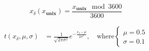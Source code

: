 \begin{equation}\label{eq:unix_time}
    x_\delta(x_{\textbf{unix}}) = \frac{x_\textbf{unix}\mod 3600}{3600}
\end{equation}

\begin{align}\label{eq:gaus}
    t(x_\delta, \mu, \sigma) &= \frac{1}{\sqrt{2\pi\sigma^2}} e^{-\frac{x_\delta-\mu}{2\sigma^2}}, \quad \text{where}
    \begin{cases}
    \mu = 0.5 \\
    \sigma = 0.1 
    \end{cases}
\end{align}
